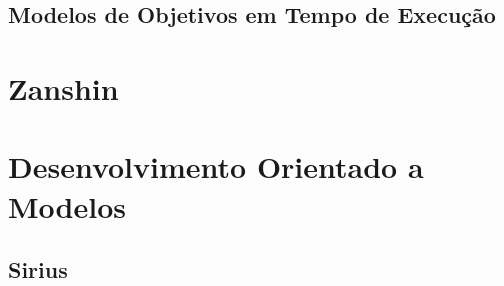 \subsection{Modelos de Objetivos em Tempo de Execução}
\label{sec-referencial-engenharia-objetivos-runtime}






\section{Zanshin}
\label{sec-referencial-engenharia-software-atividade-desenvolvimento-projeto}





\section{Desenvolvimento Orientado a Modelos}

\subsection{Sirius}

